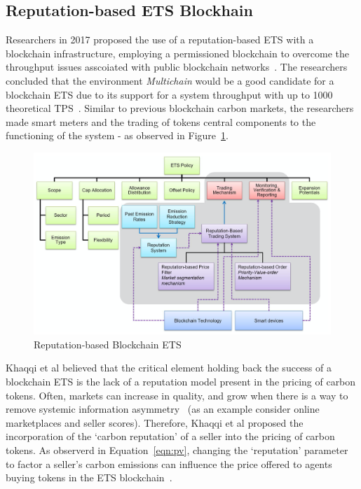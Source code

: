 \subsection{Reputation-based ETS Blockhain}

Researchers in 2017 proposed the use of a reputation-based
ETS with a blockchain infrastructure,
employing a permissioned blockchain to overcome
the throughput issues asscoiated with public
blockchain networks~\cite{KHAQQI20188}. The researchers concluded
that the environment \textit{Multichain} would be a good
candidate for a blockchain ETS due to its support for
a system throughput with up to 1000 theoretical TPS~\cite{KHAQQI20188}. Similar to
previous blockchain carbon markets, the researchers made smart
meters and the trading of tokens
central components to the functioning of
the system - as observed in Figure~\ref{fig:rep}.

\begin{figure}[ht]
    \centering
    \includegraphics[scale=0.37]{photos/reputation.png}
    \caption{Reputation-based Blockchain ETS}
    \label{fig:rep}
\end{figure}

Khaqqi et al believed that the critical element holding back
the success of a blockchain ETS is the lack of a reputation
model present in the pricing of carbon tokens. Often,
markets can increase in quality, and grow when there is a way
to remove systemic information asymmetry~\cite{KHAQQI20188}
(as an example consider online marketplaces and seller scores).
Therefore, Khaqqi et al proposed the incorporation of the
`carbon reputation' of a seller into the pricing of carbon tokens.
As observerd in Equation~\ref{eqn:pv}, changing the `reputation'
parameter to factor a seller's carbon emissions can influence the price
offered to agents buying tokens in the
ETS blockchain~\cite{KHAQQI20188}.

